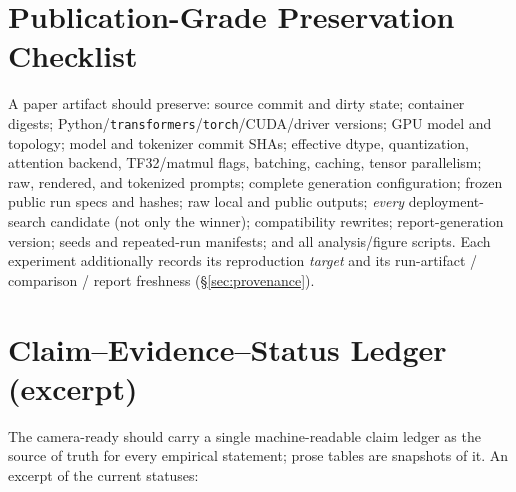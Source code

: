 \section{Publication-Grade Preservation Checklist}
\label{app:checklist}

A paper artifact should preserve: source commit and dirty state; container
digests; Python/\texttt{transformers}/\texttt{torch}/CUDA/driver versions; GPU model
and topology; model and tokenizer commit SHAs; effective dtype, quantization,
attention backend, TF32/matmul flags, batching, caching, tensor parallelism; raw,
rendered, and tokenized prompts; complete generation configuration; frozen public
run specs and hashes; raw local and public outputs; \emph{every} deployment-search
candidate (not only the winner); compatibility rewrites; report-generation
version; seeds and repeated-run manifests; and all analysis/figure scripts. Each
experiment additionally records its reproduction \emph{target} and its
run-artifact / comparison / report freshness (\S\ref{sec:provenance}).

\section{Claim--Evidence--Status Ledger (excerpt)}
\label{app:ledger}

The camera-ready should carry a single machine-readable claim ledger as the
source of truth for every empirical statement; prose tables are snapshots of it.
An excerpt of the current statuses:

